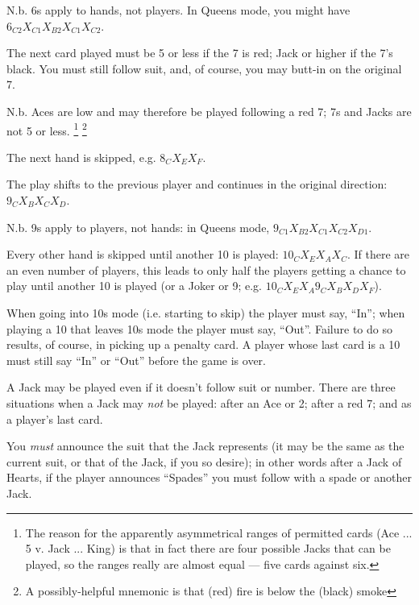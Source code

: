 \documentclass[12pt]{article}
\begin{document}
\begin{description}
    N.b. 6s apply to hands, not players.  In Queens mode, you might have $6_{C2} X_{C1} X_{B2} X_{C1} X_{C2}$.

  \item[\card{7}] The next card played must be 5 or less if the 7 is red; Jack or higher if the 7's black. You
    must still follow suit, and, of course, you may butt-in on the original 7.
    
    N.b. Aces are low and may therefore be played following a red 7; 7s and Jacks are not 5 or less.%
    \footnote{The reason for the apparently asymmetrical ranges of permitted cards (Ace ... 5 v. Jack ... King)
    is that in fact there are four possible Jacks that can be played, so the ranges really are almost
    equal --- five cards against six.}
    \footnote{A possibly-helpful mnemonic is that (red) fire is below the (black) smoke}

  \item[\card{8}]
    The next hand is skipped, e.g. $8_C X_E X_F$.

  \item[\card{9}]
    The play shifts to the previous player and continues in the original direction: $9_C X_B X_C X_D$.

    N.b. 9s apply to players, not hands: in Queens mode, $9_{C1} X_{B2} X_{C1} X_{C2} X_{D1}$.

  \item[\card{10}]
    Every other hand is skipped until another 10 is played: $10_C X_E X_A X_C$.  If there are an even number of
    players, this leads to only half the players getting a chance to play until another
    10 is played (or a Joker or 9; e.g.  $10_C X_E X_A 9_C X_B X_D X_F$).

    When going into 10s mode (i.e. starting to skip) the player must say, ``In''; when playing a
    10 that leaves 10s mode the player must say, ``Out''.  Failure to do so results, of course,
    in picking up a penalty card.  A player whose last card is a 10 must still say ``In'' or ``Out''
    before the game is over.

  \item[\card{Jack}]
    A Jack may be played even if it doesn't follow suit or number.  There are three situations
    when a Jack may \emph{not} be played:  after an Ace or 2; after a red 7; and as a player's last card.

    You \emph{must} announce the suit that the Jack represents (it may be the same as the
    current suit, or that of the Jack, if you so desire);  in other words after a Jack of
    Hearts, if the player announces ``Spades'' you must follow with a spade or another Jack.


\end{description}
\end{document}

